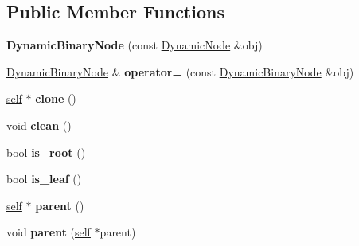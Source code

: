 \subsection*{Public Member Functions}
\begin{DoxyCompactItemize}
\item 
\mbox{\label{classez_1_1trees_1_1DynamicBinaryNode_a3c0aff288f8151d65a1f5f6cd6f3de5b}} 
{\bfseries Dynamic\+Binary\+Node} (const \hyperlink{classez_1_1trees_1_1DynamicNode}{Dynamic\+Node} \&obj)
\item 
\mbox{\label{classez_1_1trees_1_1DynamicBinaryNode_a6e1ee2312112126c382862a7351fe9e9}} 
\hyperlink{classez_1_1trees_1_1DynamicBinaryNode}{Dynamic\+Binary\+Node} \& {\bfseries operator=} (const \hyperlink{classez_1_1trees_1_1DynamicBinaryNode}{Dynamic\+Binary\+Node} \&obj)
\item 
\mbox{\label{classez_1_1trees_1_1DynamicBinaryNode_a37991401d8e59e511c961063ffba0b75}} 
\hyperlink{classez_1_1trees_1_1DynamicBinaryNode}{self} $\ast$ {\bfseries clone} ()
\item 
\mbox{\label{classez_1_1trees_1_1DynamicBinaryNode_a466a8d0334eaa62aefe514d7de13553e}} 
void {\bfseries clean} ()
\item 
\mbox{\label{classez_1_1trees_1_1DynamicBinaryNode_a09006260f87e7df96c64a75eb79fc834}} 
bool {\bfseries is\+\_\+root} ()
\item 
\mbox{\label{classez_1_1trees_1_1DynamicBinaryNode_abd663d6ed47256c1177a2ff17b89c041}} 
bool {\bfseries is\+\_\+leaf} ()
\item 
\mbox{\label{classez_1_1trees_1_1DynamicBinaryNode_adf14c1f0dddfa44a1e569be4c7e117f8}} 
\hyperlink{classez_1_1trees_1_1DynamicBinaryNode}{self} $\ast$ {\bfseries parent} ()
\item 
\mbox{\label{classez_1_1trees_1_1DynamicBinaryNode_a345ab5ff3a728a6c5f8105204b8fb236}} 
void {\bfseries parent} (\hyperlink{classez_1_1trees_1_1DynamicBinaryNode}{self} $\ast$parent)

\end{DoxyCompactItemize}
